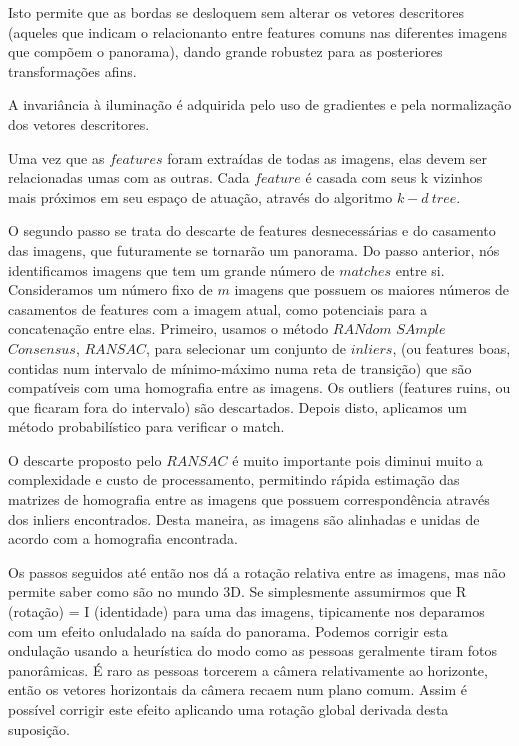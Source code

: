 \documentclass[conference]{IEEEtran}
\begin{document}
     Isto permite que as bordas se desloquem sem alterar os vetores descritores (aqueles que indicam o relacionanto entre
     features comuns nas diferentes imagens que comp\~oem o panorama), dando grande robustez para as posteriores transforma\c{c}\~oes
     afins.
     
     A invari\^ancia \`a ilumina\c{c}\~ao \'e adquirida pelo uso de gradientes e pela normaliza\c{c}\~ao dos vetores descritores.
  
    Uma vez que as $features$ foram extra\'idas de todas as imagens, elas devem ser relacionadas umas com as outras. Cada $feature$ 
    \'e casada com seus k vizinhos mais pr\'oximos em seu espa\c{c}o de atua\c{c}\~ao, atrav\'es do algoritmo $k-d\>tree$.
  
  O segundo passo se trata do descarte de features desnecess\'arias e do casamento das imagens, que futuramente se tornar\~ao
  um panorama. Do passo anterior, n\'os identificamos imagens que tem um grande n\'umero de $matches$ entre si. Consideramos um n\'umero
  fixo de $m$ imagens que possuem os maiores n\'umeros de casamentos de features com a imagem atual, como potenciais para 
  a concatena\c{c}\~ao entre elas. Primeiro, usamos o m\'etodo $RANdom$ $SAmple$ $Consensus$, $RANSAC$, para selecionar
  um conjunto de $inliers$, (ou features boas, contidas num intervalo de m\'inimo-m\'aximo numa reta de transi\c{c}\~ao) que
  s\~ao compat\'iveis com uma homografia entre as imagens. Os outliers (features ruins, ou que ficaram fora do intervalo)
  s\~ao descartados. Depois disto, aplicamos um m\'etodo probabil\'istico para verificar o match.
  
  O descarte proposto pelo $RANSAC$ \'e muito importante pois diminui muito a complexidade e custo de processamento, 
  permitindo r\'apida estima\c{c}\~ao das matrizes de homografia entre as imagens que possuem correspond\^encia atrav\'es
  dos inliers encontrados. Desta maneira, as imagens s\~ao alinhadas e unidas de acordo com a homografia encontrada.
  
  Os passos seguidos at\'e ent\~ao nos d\'a a rota\c{c}\~ao relativa entre as imagens, mas n\~ao permite saber como s\~ao
  no mundo 3D. Se simplesmente assumirmos que R (rota\c{c}\~ao) = I (identidade) para uma das imagens, tipicamente nos deparamos 
  com um efeito onludalado na sa\'ida do panorama. Podemos corrigir esta ondula\c{c}\~ao usando a heur\'istica do modo 
  como as pessoas geralmente tiram fotos panor\^amicas. \'E raro as pessoas torcerem a c\^amera relativamente ao horizonte, 
  ent\~ao os vetores horizontais da c\^amera recaem num plano comum. Assim \'e poss\'ivel corrigir este efeito aplicando
  uma rota\c{c}\~ao global derivada desta suposi\c{c}\~ao.
  
\end{document}
